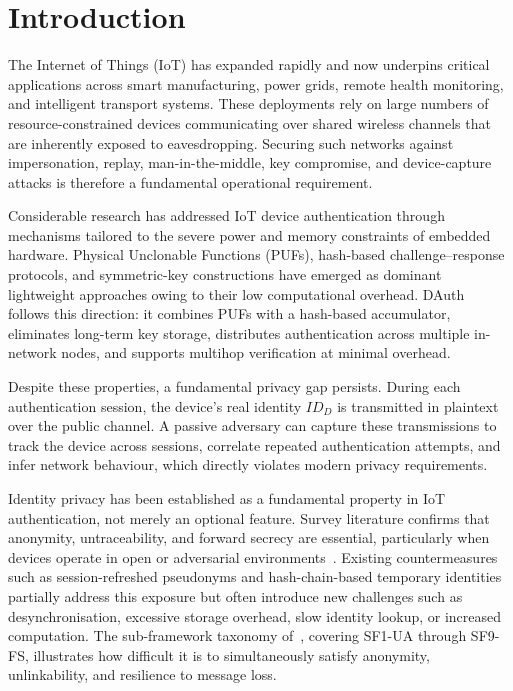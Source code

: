 \chapter{Introduction}

The Internet of Things (IoT) has expanded rapidly and now underpins critical
applications across smart manufacturing, power grids, remote health monitoring,
and intelligent transport systems.
These deployments rely on large numbers of resource-constrained devices communicating
over shared wireless channels that are inherently exposed to eavesdropping.
Securing such networks against impersonation, replay, man-in-the-middle, key
compromise, and device-capture attacks is therefore a fundamental operational
requirement.

Considerable research has addressed IoT device authentication through mechanisms
tailored to the severe power and memory constraints of embedded hardware.
Physical Unclonable Functions (PUFs), hash-based challenge--response protocols, and
symmetric-key constructions have emerged as dominant lightweight approaches owing to
their low computational overhead.
DAuth~\cite{das2026comsnets} follows this direction: it combines PUFs with a
hash-based accumulator, eliminates long-term key storage, distributes authentication
across multiple in-network nodes, and supports multihop verification at minimal
overhead.

Despite these properties, a fundamental privacy gap persists.
During each authentication session, the device's real identity $ID_D$ is transmitted
in plaintext over the public channel.
A passive adversary can capture these transmissions to track the device across
sessions, correlate repeated authentication attempts, and infer network
behaviour, which directly violates modern privacy requirements.

Identity privacy has been established as a fundamental property in IoT
authentication, not merely an optional feature.
Survey literature confirms that anonymity, untraceability, and forward secrecy are
essential, particularly when devices operate in open or adversarial
environments~\cite{zhong2025survey}.
Existing countermeasures such as session-refreshed pseudonyms and hash-chain-based
temporary identities partially address this exposure but often introduce new
challenges such as desynchronisation, excessive storage overhead, slow identity
lookup, or increased computation.
The sub-framework taxonomy of~\cite{zhong2025survey}, covering SF1-UA through
SF9-FS, illustrates how difficult it is to simultaneously satisfy anonymity,
unlinkability, and resilience to message loss.

